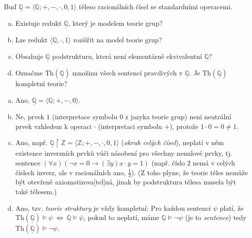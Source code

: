 \begin{problem}

    Buď $\underline{\mathbb{Q}}=\langle\mathbb{Q};+,-,\cdot,0,1 \rangle$ těleso racionálních čísel se standardními operacemi.
    \begin{enumerate}[(a)]                
        \item Existuje redukt $\underline{\mathbb{Q}}$, který je modelem teorie grup?
        \item Lze redukt $\langle\mathbb{Q},\cdot,1\rangle$ rozšířit na model teorie grup?
        \item Obsahuje $\underline{\mathbb{Q}}$ podstrukturu, která není elementárně ekvivalentní $\underline{\mathbb{Q}}$?
        \item Označme $\mathrm{Th}(\underline{\mathbb{Q}})$ množinu všech sentencí pravdivých v $\underline{\mathbb{Q}}$. Je $\mathrm{Th}(\underline{\mathbb{Q}})$ kompletní teorie?
    \end{enumerate}

    \begin{solution}

        \begin{enumerate}[(a)]
            \item Ano, $\underline{\mathbb{Q}}=\langle\mathbb{Q};+,-,0\rangle$.
            \item Ne, prvek $1$ (interpretace symbolu $0$ z jazyka teorie grup) není neutrální prvek vzhledem k operaci $\cdot$ (interpretaci symbolu $+$), protože $1\cdot 0=0\neq 1$.
            \item Ano, např. $\underline{\mathbb{Q}}\restriction\mathbb Z =\langle\mathbb{Z};+,-,\cdot,0,1 \rangle$ (\emph{okruh celých čísel}), neplatí v něm existence inverzních prvků vůči násobení pro všechny nenulové prvky, tj. sentence $(\forall x)(\neg x=0\to (\exists y)x\cdot y=1)$ (např. číslo 2 nemá v celých číslech inverz, ale v racionálních ano, $\frac{1}{2}$). (Z toho plyne, že teorie těles nemůže být otevřeně axiomatizova[tel]ná, jinak by podstruktura tělesa musela být také tělesem.)
            \item Ano, tzv. \emph{teorie struktury} je vždy kompletní: Pro každou sentenci $\psi$ platí, že $\mathrm{Th}(\underline{\mathbb{Q}})\models\psi\ \Leftrightarrow\ \underline{\mathbb{Q}}\models\psi$, pokud to neplatí, máme $\underline{\mathbb{Q}}\models\neg\psi$ (je to \emph{sentence}) tedy $\mathrm{Th}(\underline{\mathbb{Q}})\models\neg\psi$.
        \end{enumerate}
                    
    \end{solution}

\end{problem}



